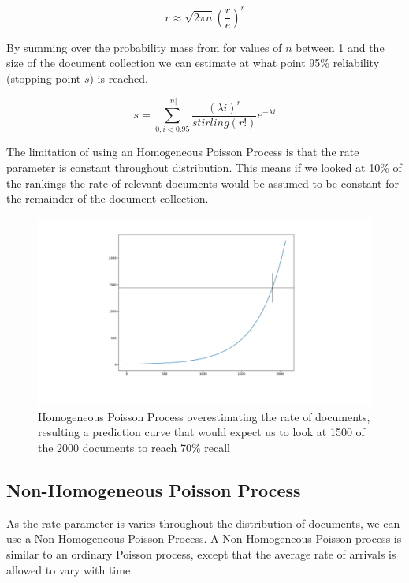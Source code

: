 \begin{equation}
	   r \approx \sqrt{2\pi n} \left( \frac{r}{e} \right) ^r
\end{equation}

By summing over the probability mass from for values of $n$ between 1 and the size of the document collection we can estimate at what point 95\% reliability (stopping point $s$) is reached. 

\begin{equation}
	   s = \sum_{0, i < 0.95}^{|n|} \frac{(\lambda i)^r}{stirling(r!)} e ^ {-\lambda i}
\end{equation}

The limitation of using an Homogeneous Poisson Process is that the rate parameter is constant throughout distribution. This means if we looked at 10\% of the rankings the rate of relevant documents would be assumed to be constant for the remainder of the document collection.


\begin{figure}[H]
\center
\includegraphics[width=16cm]{figures/overestimate.png}
\caption{Homogeneous Poisson Process overestimating the rate of documents, resulting a prediction curve that would expect us to look at 1500 of the 2000 documents to reach 70\% recall}
\end{figure}

\subsection{Non-Homogeneous Poisson Process}

As the rate parameter is varies throughout the distribution of documents, we can use a Non-Homogeneous Poisson Process. A Non-Homogeneous Poisson process is similar to an ordinary Poisson process, except that the average rate of arrivals is allowed to vary with time. 



